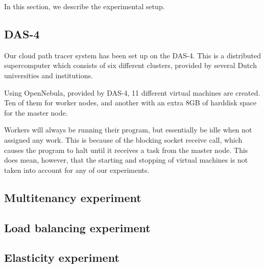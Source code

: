 In this section, we describe the experimental setup.

\subsection{DAS-4}
Our cloud path tracer system has been set up on the DAS-4\cite{das4}.
This is a distributed supercomputer which consists of six different clusters, provided by several Dutch universities and institutions.

Using OpenNebula, provided by DAS-4, 11 different virtual machines are created.
Ten of them for worker nodes, and another with an extra 8GB of harddisk space for the master node.

Workers will always be running their program, but essentially be idle when not assigned any work.
This is because of the blocking socket receive call, which causes the program to halt until it receives a task from the master node.
This does mean, however, that the starting and stopping of virtual machines is not taken into account for any of our experiments.

\subsection{Multitenancy experiment}

\subsection{Load balancing experiment}

\subsection{Elasticity experiment}